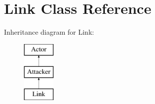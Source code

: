 \hypertarget{classLink}{}\section{Link Class Reference}
\label{classLink}
Inheritance diagram for Link\+:\begin{figure}[H]
\begin{center}
\leavevmode
\includegraphics[height=3.000000cm]{classLink}
\end{center}
\end{figure}
